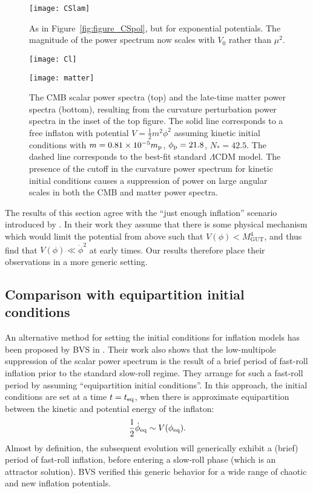 %
\begin{figure}
  \texttt{[image: CSlam]}
  \caption{As in Figure~\protect\ref{fig:figure_CSpol}, but for exponential potentials. The magnitude of the power spectrum now scales with $V_0$ rather than $\mu^2$.  }
  \label{fig:figure_CSlam}
\end{figure}
%

%
\begin{figure}
  \centerline{\texttt{[image: Cl]}}
  \centerline{\texttt{[image: matter]}}
  \caption{The CMB scalar power spectra (top) and the late-time matter power spectra (bottom), resulting from the curvature perturbation power spectra in the inset of the top figure. The solid line corresponds to a free inflaton with potential $V=\frac{1}{2}m^2\phi^2$ assuming kinetic initial conditions with $m=0.81\times10^{-5}m_{\mathrm{p}}$, $\phi_{\mathrm{p}} = 21.8$, $N_*=42.5$. The dashed line corresponds to the best-fit standard $\Lambda$CDM model.  The presence of the cutoff in the curvature power spectrum for kinetic initial conditions causes a suppression of power on large angular scales in both the CMB and matter power spectra.  } \label{fig:figure_Cl}
\end{figure}
%
The results of this section agree with the ``just enough inflation'' scenario introduced by \citet{Ramirez_excluded_2009,Ramirez_predictions_2012,Ramirez_low_2012}.  In their work they assume that there is some physical mechanism which would limit the potential from above such that $V(\phi)<M_\mathrm{GUT}^4$, and thus find that $V(\phi)\ll\dot{\phi}^2$ at early times. Our results therefore place their observations in a more generic setting.


\subsection{Comparison with equipartition initial conditions}
\label{sec:comparison}

An alternative method for setting the initial conditions for inflation models has been proposed by BVS in \citep{boyanovsky_cmb_2006}. Their work also shows that the low-multipole suppression of the scalar power spectrum is the result of a brief period of fast-roll inflation prior to the standard slow-roll regime. They arrange for such a fast-roll period by assuming ``equipartition initial conditions''. In this approach, the initial conditions are set at a time $t=t_{\mathrm{eq}}$, when there is approximate equipartition between the kinetic and potential energy of the inflaton:
%
\begin{equation}
  \frac{1}{2}\dot{\phi}_{\mathrm{eq}} \sim V(\phi_{\mathrm{eq}}).
  \label{eqn:bvsbc}
\end{equation}
%
Almost by definition, the subsequent evolution will generically exhibit a (brief) period of fast-roll inflation, before entering a slow-roll phase (which is an attractor solution). BVS verified this generic behavior for a wide range of chaotic and new inflation potentials.

